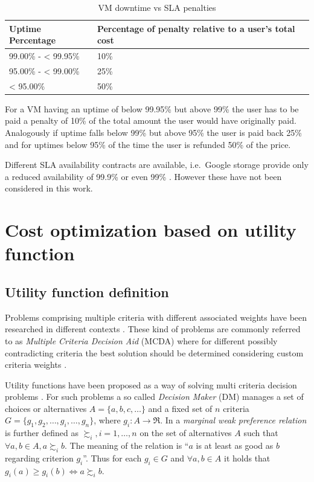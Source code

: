 \begin{table}[htbp]
\centering
\begin{tabular}{ll}
  \hline
	Uptime Percentage & Percentage of penalty relative to a user's total cost	 \\
  \hline
	99.00\% - < 99.95\%	& 10\% \\
	95.00\% - < 99.00\%	& 25\% \\
	< 95.00\%				& 50\% \\
   \hline
\end{tabular}
\caption{VM downtime vs SLA penalties}
\label{tab:sla_penalties}
\end{table}


For a VM having an uptime of below 99.95\% but above 99\% the user has to be paid a penalty of 10\% of the total amount the user would have originally paid. Analogously if uptime falls below 99\% but above 95\% the user is paid back 25\% and for uptimes below 95\% of the time the user is refunded 50\% of the price. 

Different SLA availability contracts are available, i.e.~Google storage provide only a reduced availability of 99.9\% or even 99\% \cite{google2015storage}. However these have not been considered in this work. 

\section{Cost optimization based on utility function}

\subsection{Utility function definition}

Problems comprising multiple criteria with different associated weights have been researched in different contexts \cite{angilella2004assessing, dulmin2003supplier}. These kind of problems are commonly referred to as \textit{Multiple Criteria Decision Aid} (MCDA) where for different possibly contradicting criteria the best solution should be determined considering custom criteria weights \cite{dulmin2003supplier}. 

Utility functions have been proposed as a way of solving multi criteria decision problems \cite{angilella2004assessing, afriat1967construction}. 
For such problems a so called \textit{Decision Maker} (DM) manages a set of choices or alternatives $A = \{a,b,c,\ldots\}$ and a fixed set of $n$ criteria $G = \{g_1,g_2,\ldots,g_i,\ldots,g_n\}$, where $g_i : A \rightarrow \mathfrak{R}$. 
In \cite{angilella2004assessing} a \textit{marginal weak preference relation} is further defined as $\succsim_i, i = 1,\ldots,n$ on the set of alternatives $A$ such that $\forall a,b \in A, a \succsim_i b$. The meaning of the relation is ``$a$ is at least as good as $b$ regarding criterion $g_i$''. 
Thus for each $g_i \in G$ and $\forall a,b \in A$ it holds that $g_i(a) \geq g_i(b) \Leftrightarrow a \succsim_i b$. 

